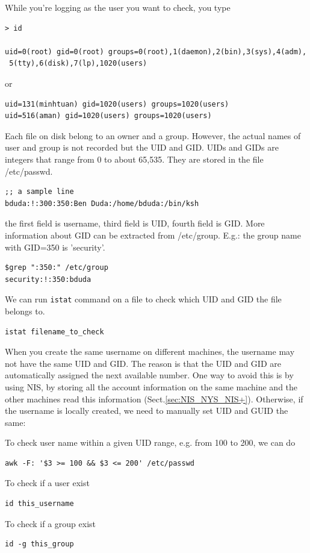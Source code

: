 While you're logging as the user you want to check, you type
\begin{verbatim}
> id

uid=0(root) gid=0(root) groups=0(root),1(daemon),2(bin),3(sys),4(adm),
 5(tty),6(disk),7(lp),1020(users)

\end{verbatim}
or
\begin{verbatim}
uid=131(minhtuan) gid=1020(users) groups=1020(users)
uid=516(aman) gid=1020(users) groups=1020(users)
\end{verbatim}
Each file on disk belong to an owner and a group. However, the actual names of
user and group is not recorded but the UID and GID. UIDs and GIDs are integers
that range from 0 to about 65,535. They are stored in the file /etc/passwd. 
\begin{verbatim}
;; a sample line
bduda:!:300:350:Ben Duda:/home/bduda:/bin/ksh
\end{verbatim}
the first field is username, third field is UID, fourth field is GID. More
information about GID can be extracted from /etc/group. E.g.: the group name
with GID=350 is 'security'.
\begin{verbatim}
$grep ":350:" /etc/group
security:!:350:bduda
\end{verbatim}

We can run \verb!istat! command on a file to check which UID and GID the file
belongs to.
\begin{verbatim}	
istat filename_to_check
\end{verbatim}

When you create the same username on different machines, the username may not
have the same UID and GID. The reason is that the UID and GID are automatically
assigned the next available number. One way to avoid this is by using NIS, by
storing all the account information on the same machine and the other machines
read this information (Sect.\ref{sec:NIS_NYS_NIS+}). Otherwise, if the
username is locally created, we need to manually set UID and GUID the same:

To check user name within a given UID range, e.g. from 100 to 200, we can
do
\begin{verbatim}
awk -F: '$3 >= 100 && $3 <= 200' /etc/passwd
\end{verbatim}
To check if a user exist
\begin{verbatim}
id this_username
\end{verbatim}
To check if a group exist
\begin{verbatim}
id -g this_group
\end{verbatim}

